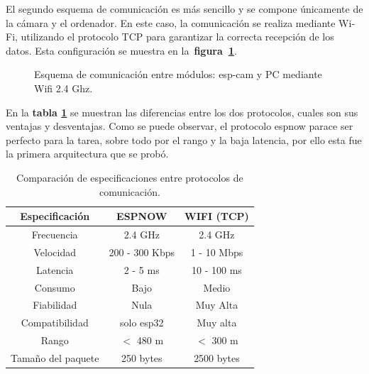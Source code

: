 El segundo esquema de comunicación es más sencillo y se compone únicamente de la cámara y el ordenador. En este caso, la comunicación se realiza mediante Wi-Fi, utilizando el protocolo TCP para garantizar la correcta recepción de los datos. Esta configuración se muestra en la~\textbf{figura~\ref{fig:comms_esquema_wifi}}.

\vspace{1cm}
\begin{figure}[H] %
    \centering
    \caption{Esquema de comunicación entre módulos: esp-cam y PC mediante Wifi 2.4 Ghz.}
    \label{fig:comms_esquema_wifi}
\end{figure}

En la \textbf{tabla \ref{tab:comp_now_wifi}} se muestran las diferencias entre los dos protocolos, cuales son sus ventajas y desventajas. Como se puede observar, el protocolo espnow parace ser perfecto para la tarea, sobre todo por el rango y la baja latencia, por ello esta fue la primera arquitectura que se probó.

\begin{table}[H]
    \centering
    \begin{tabular}{|c|c|c|}
        \hline
        \textbf{Especificación} & \textbf{ESPNOW} & \textbf{WIFI (TCP)} \\
        \hline
        Frecuencia      & 2.4 GHz & 2.4 GHz \\
        Velocidad       & 200 - 300 Kbps & 1 - 10 Mbps \\
        Latencia        & 2 - 5 ms & 10 - 100 ms\\
        Consumo         & Bajo & Medio \\
        Fiabilidad      & Nula & Muy Alta\\
        Compatibilidad  & solo esp32 & Muy alta\\
        Rango           & $<$ 480 m & $<$ 300 m\\
        Tamaño del paquete & 250 bytes & 2500 bytes \\
        \hline
    \end{tabular}
    \caption{Comparación de especificaciones entre protocolos de comunicación.}
    \label{tab:comp_now_wifi}
\end{table}

